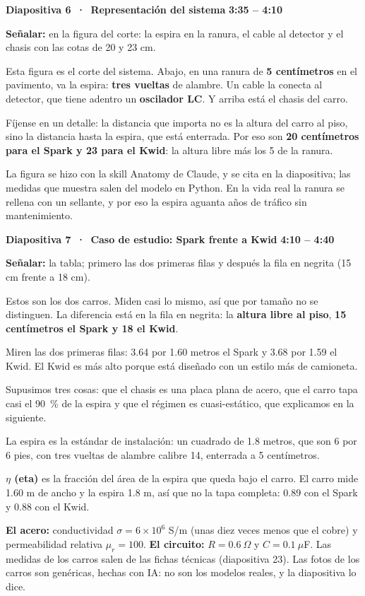 \documentclass[11pt,a4paper]{article}
\newcommand{\diapo}[3]{%
  \par\vspace{8pt}
  {\large\bfseries Diapositiva #1 \,·\, #2}\hfill{\normalsize\bfseries\color{AzulIcesi} #3}\par
  \vspace{1pt}}
\newcommand{\senala}[1]{{\small\color{AzulIcesi}\textbf{Señalar:} #1}\par}
\begin{document}
\diapo{6}{Representación del sistema}{3:35 -- 4:10}
\senala{en la figura del corte: la espira en la ranura, el cable al detector y el chasis con las cotas de 20 y
23 cm.}

Esta figura es el corte del sistema. Abajo, en una ranura de \textbf{5 centímetros} en el pavimento, va la espira:
\textbf{tres vueltas} de alambre. Un cable la conecta al detector, que tiene adentro un \textbf{oscilador LC}. Y
arriba está el chasis del carro.

Fíjense en un detalle: la distancia que importa no es la altura del carro al piso, sino la distancia hasta la
espira, que está enterrada. Por eso son \textbf{20 centímetros para el Spark y 23 para el Kwid}: la altura libre
más los 5 de la ranura.

\begin{nota}
La figura se hizo con la skill Anatomy de Claude, y se cita en la diapositiva; las medidas que muestra salen del
modelo en Python. En la vida real la ranura se rellena con un sellante, y por eso la espira aguanta años de tráfico
sin mantenimiento.
\end{nota}

\diapo{7}{Caso de estudio: Spark frente a Kwid}{4:10 -- 4:40}
\senala{la tabla; primero las dos primeras filas y después la fila en negrita (15 cm frente a 18 cm).}

Estos son los dos carros. Miden casi lo mismo, así que por tamaño no se distinguen. La diferencia está en la fila
en negrita: la \textbf{altura libre al piso}, \textbf{15 centímetros el Spark y 18 el Kwid}.

\begin{opcional}
Miren las dos primeras filas: 3.64 por 1.60 metros el Spark y 3.68 por 1.59 el Kwid. El Kwid es más alto porque
está diseñado con un estilo más de camioneta.
\end{opcional}

Supusimos tres cosas: que el chasis es una placa plana de acero, que el carro tapa casi el 90~\% de la espira y
que el régimen es cuasi-estático, que explicamos en la siguiente.

\begin{opcional}
La espira es la estándar de instalación: un cuadrado de 1.8 metros, que son 6 por 6 pies, con tres vueltas de
alambre calibre 14, enterrada a 5 centímetros.
\end{opcional}

\begin{nota}
\textbf{$\eta$ (eta)} es la fracción del área de la espira que queda bajo el carro. El carro mide 1.60 m de ancho y la
espira 1.8 m, así que no la tapa completa: 0.89 con el Spark y 0.88 con el Kwid.

\textbf{El acero:} conductividad $\sigma = 6\times10^6$ S/m (unas diez veces menos que el cobre) y permeabilidad
relativa $\mu_r = 100$. \textbf{El circuito:} $R = 0.6~\Omega$ y $C = 0.1~\mu$F. Las medidas de los carros salen de
las fichas técnicas (diapositiva 23). Las fotos de los carros son genéricas, hechas con IA: no son los modelos
reales, y la diapositiva lo dice.
\end{nota}
\end{document}
